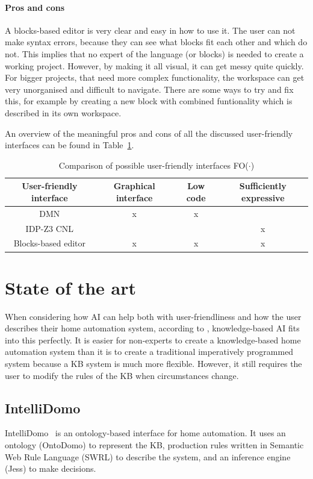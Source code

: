 \documentclass[11pt,a4paper]{report}
\newcommand{\fodot}{FO($\cdot$)\xspace}
\begin{document}
\paragraph{Pros and cons}
A blocks-based editor is very clear and easy in how to use it. The user can not make syntax errors, because they can see what blocks fit each other and which do not. This implies that no expert of the language (or blocks) is needed to create a working project. However, by making it all visual, it can get messy quite quickly. For bigger projects, that need more complex functionality, the workspace can get very unorganised and difficult to navigate. There are some ways to try and fix this, for example by creating a new block with combined funtionality which is described in its own workspace. 

An overview of the meaningful pros and cons of all the discussed user-friendly interfaces can be found in Table~\ref{tab:user-friendly_comparison}.

\begin{table}
    \centering
    \caption{Comparison of possible user-friendly interfaces \fodot}
    \label{tab:user-friendly_comparison}
    \begin{tabular}{|c|c|c|c|}
    \hline
    User-friendly interface & Graphical interface & Low code & Sufficiently expressive \\ \hline
    DMN & x & x &   \\ \hline
    IDP-Z3 CNL &  &  & x  \\ \hline
    Blocks-based editor & x & x & x \\ \hline
    \end{tabular}
\end{table}

\section{State of the art}
When considering how AI can help both with user-friendliness and how the user describes their home automation system, according to \cite{SOTA_KnowledgeBasedAIInHomeAutomation}, knowledge-based AI fits into this perfectly. It is easier for non-experts to create a knowledge-based home automation system than it is to create a traditional imperatively programmed system because a KB system is much more flexible. However, it still requires the user to modify the rules of the KB when circumstances change.

\subsection{IntelliDomo}
IntelliDomo~\cite{SOTA_OntologyBased} is an ontology-based interface for home automation. It uses an ontology (OntoDomo) to represent the KB, production rules written in Semantic Web Rule Language (SWRL) to describe the system, and an inference engine (Jess) to make decisions.
\end{document}
